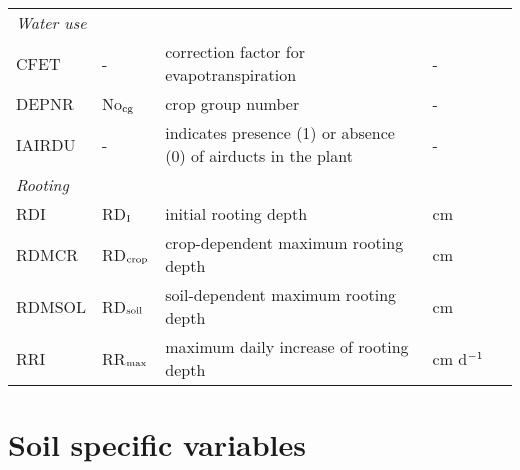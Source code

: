 \begin{longtable}[c]{
       p{0.1\linewidth}p{0.1\linewidth}p{0.6\linewidth}p{0.2\linewidth}
       }
\multicolumn{4}{l}{\textit{Water use}}\\
CFET & - & correction factor for evapotranspiration    &   -\\
DEPNR & No$_{{\rm cg}}$ & crop group number   &    -\\
IAIRDU & - & indicates presence (1) or absence (0) of airducts in the plant &   -\\

\multicolumn{4}{l}{\textit{Rooting}}\\
RDI & RD$_{{\rm I}}$ & initial rooting depth   &    cm\\
RDMCR & RD$_{{\rm crop}}$ & crop-dependent maximum rooting depth    &   cm\\
RDMSOL & RD$_{{\rm soil}}$ & soil-dependent maximum rooting depth   &    cm\\
RRI & RR$_{{\rm max}}$ & maximum daily increase of rooting depth   &    cm d$^{{\rm -1}}$\\

\hline \hline
                      
\end{longtable}

 
\section*{Soil specific variables}

